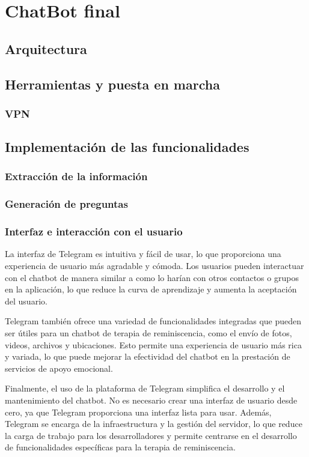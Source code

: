 \chapter{ChatBot final}
\label{cap:ChatBot final}
\section{Arquitectura}
\section{Herramientas y puesta en marcha}
\subsection{VPN}
\section{Implementación de las funcionalidades}
\subsection{Extracción de la información}
\subsection{Generación de preguntas}
\subsection{Interfaz e interacción con el usuario}
La interfaz de Telegram es intuitiva y fácil de usar, lo que proporciona una experiencia de usuario más agradable y cómoda. Los usuarios pueden interactuar con el chatbot de manera similar a como lo harían con otros contactos o grupos en la aplicación, lo que reduce la curva de aprendizaje y aumenta la aceptación del usuario.

Telegram también ofrece una variedad de funcionalidades integradas que pueden ser útiles para un chatbot de terapia de reminiscencia, como el envío de fotos, videos, archivos y ubicaciones. Esto permite una experiencia de usuario más rica y variada, lo que puede mejorar la efectividad del chatbot en la prestación de servicios de apoyo emocional.

Finalmente, el uso de la plataforma de Telegram simplifica el desarrollo y el mantenimiento del chatbot. No es necesario crear una interfaz de usuario desde cero, ya que Telegram proporciona una interfaz lista para usar. Además, Telegram se encarga de la infraestructura y la gestión del servidor, lo que reduce la carga de trabajo para los desarrolladores y permite centrarse en el desarrollo de funcionalidades específicas para la terapia de reminiscencia.

